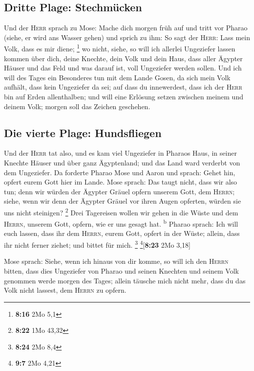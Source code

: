 \hypertarget{dritte-plage-stechmuxfccken}{%
\subsection{Dritte Plage:
Stechmücken}\label{dritte-plage-stechmuxfccken}}

 Und der \textsc{Herr} sprach zu Mose: Mache dich morgen
früh auf und tritt vor Pharao (siehe, er wird ans Wasser gehen) und
sprich zu ihm: So sagt der \textsc{Herr}: Lass mein Volk, dass es mir
diene; \footnote{\textbf{8:16} 2Mo 5,1}  wo nicht, siehe,
so will ich allerlei Ungeziefer lassen kommen über dich, deine Knechte,
dein Volk und dein Haus, dass aller Ägypter Häuser und das Feld und was
darauf ist, voll Ungeziefer werden sollen.  Und ich will
des Tages ein Besonderes tun mit dem Lande Gosen, da sich mein Volk
aufhält, dass kein Ungeziefer da sei; auf dass du innewerdest, dass ich
der \textsc{Herr} bin auf Erden allenthalben;  und will
eine Erlösung setzen zwischen meinem und deinem Volk; morgen soll das
Zeichen geschehen.

\hypertarget{die-vierte-plage-hundsfliegen}{%
\subsection{Die vierte Plage:
Hundsfliegen}\label{die-vierte-plage-hundsfliegen}}

 Und der \textsc{Herr} tat also, und es kam viel
Ungeziefer in Pharaos Haus, in seiner Knechte Häuser und über ganz
Ägyptenland; und das Land ward verderbt von dem Ungeziefer.
 Da forderte Pharao Mose und Aaron und sprach: Gehet hin,
opfert eurem Gott hier im Lande.  Mose sprach: Das taugt
nicht, dass wir also tun; denn wir würden der Ägypter Gräuel opfern
unserem Gott, dem \textsc{Herrn}; siehe, wenn wir denn der Ägypter
Gräuel vor ihren Augen opferten, würden sie uns nicht steinigen?
\footnote{\textbf{8:22} 1Mo 43,32}  Drei Tagereisen
wollen wir gehen in die Wüste und dem \textsc{Herrn}, unserem Gott,
opfern, wie er uns gesagt hat. \textsuperscript{b} 
Pharao sprach: Ich will euch lassen, dass ihr dem \textsc{Herrn}, eurem
Gott, opfert in der Wüste; allein, dass ihr nicht ferner ziehet; und
bittet für mich. \footnote{\textbf{8:24} 2Mo 8,4}
\footnote{\textbf{9:7} 2Mo 4,21}{[}\textbf{8:23} 2Mo 3,18{]}

 Mose sprach: Siehe, wenn ich hinaus von dir komme, so
will ich den \textsc{Herrn} bitten, dass dies Ungeziefer von Pharao und
seinen Knechten und seinem Volk genommen werde morgen des Tages; allein
täusche mich nicht mehr, dass du das Volk nicht lassest, dem
\textsc{Herrn} zu opfern.

